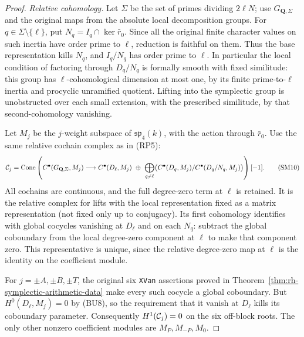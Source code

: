 \begin{proof}
\emph{Relative cohomology.}
Let \(\Sigma\) be the set of primes dividing \(2\ell N\);
use \(G_{\mathbf Q,\Sigma}\) and the original maps from the
absolute local decomposition groups. For \(q\in\Sigma\setminus
\{\ell\}\), put \(N_q=I_q\cap\ker\bar r_0\).
Since all the original finite character values on such
inertia have order prime to \(\ell\), reduction is faithful
on them. Thus the base representation kills \(N_q\),
and \(I_q/N_q\) has order prime to \(\ell\).
In particular the local condition of factoring through
\(D_q/N_q\) is formally smooth with fixed similitude:
this group has \(\ell\)-cohomological dimension at most one,
by its finite prime-to-\(\ell\) inertia and procyclic
unramified quotient. Lifting into the symplectic group
is unobstructed over each small extension, with the
prescribed similitude, by that second-cohomology vanishing.

Let \(M_j\) be the \(j\)-weight subspace of
\(\mathfrak{sp}_4(k)\), with the action through \(\bar r_0\).
Use the same relative cochain complex as in (RP5):
\[
 {\cal C}_j=
 \operatorname{Cone}\left(
 C^\bullet(G_{\mathbf Q,\Sigma},M_j)\longrightarrow
 C^\bullet(D_\ell,M_j)\ \oplus\
 \bigoplus_{q\ne\ell}
 \bigl(C^\bullet(D_q,M_j)/C^\bullet(D_q/N_q,M_j)\bigr)
 \right)[-1].                                                 \tag{SM10}
\]
All cochains are continuous, and the full degree-zero term
at \(\ell\) is retained. It is the relative complex for
lifts with the local representation fixed as a matrix
representation (not fixed only up to conjugacy).
Its first cohomology identifies with global cocycles
vanishing at \(D_\ell\) and on each \(N_q\):
subtract the global coboundary from the local degree-zero
component at \(\ell\) to make that component zero.
This representative is unique, since the relative
degree-zero map at \(\ell\) is the identity on the
coefficient module.

For \(j=\pm A,\pm B,\pm T\), the original six \texttt{XVan}
assertions proved in Theorem~\ref{thm:rh-symplectic-arithmetic-data}
make every such cocycle a global coboundary.
But \(H^0(D_\ell,M_j)=0\) by (BU8), so the requirement that
it vanish at \(D_\ell\) kills its coboundary parameter.
Consequently \(H^1({\cal C}_j)=0\) on the six off-block
roots. The only other nonzero coefficient modules are
\(M_{P},M_{-P},M_0\).


\end{proof}
